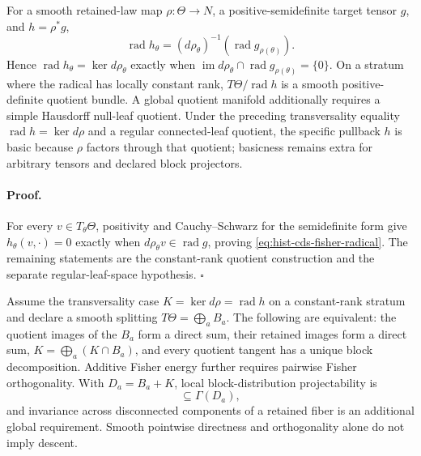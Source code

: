 For a smooth retained-law map \(\rho:\Theta\to N\), a positive-semidefinite
target tensor \(g\), and \(h=\rho^*g\),
\begin{equation}
\operatorname{rad}h_\theta
=(d\rho_\theta)^{-1}(\operatorname{rad}g_{\rho(\theta)}).
\label{eq:hist-cds-fisher-radical}
\end{equation}
Hence \(\operatorname{rad}h_\theta=\ker d\rho_\theta\) exactly when
\(\operatorname{im}d\rho_\theta\cap\operatorname{rad}g_{\rho(\theta)}
=\{0\}\).  On a stratum where the radical has locally constant rank,
\(T\Theta/\operatorname{rad}h\) is a smooth positive-definite quotient
bundle.  A global quotient manifold additionally requires a simple Hausdorff
null-leaf quotient.  Under the preceding transversality equality
\(\operatorname{rad}h=\ker d\rho\) and a regular connected-leaf quotient, the
specific pullback \(h\) is basic because \(\rho\) factors through that
quotient; basicness remains extra for arbitrary tensors and declared block
projectors.

\paragraph{Proof.}
For every \(v\in T_\theta\Theta\), positivity and Cauchy--Schwarz for the
semidefinite form give
\(h_\theta(v,\cdot)=0\) exactly when
\(d\rho_\theta v\in\operatorname{rad}g\), proving
\eqref{eq:hist-cds-fisher-radical}.  The remaining statements are the
constant-rank quotient construction and the separate regular-leaf-space
hypothesis.  \(\square\)

Assume the transversality case
\(K=\ker d\rho=\operatorname{rad}h\) on a constant-rank stratum and declare
a smooth splitting \(T\Theta=\bigoplus_aB_a\).  The following are equivalent:
the quotient images of the \(B_a\) form a direct sum, their retained images
form a direct sum, \(K=\bigoplus_a(K\cap B_a)\), and every quotient tangent
has a unique block decomposition.  Additive Fisher energy further requires
pairwise Fisher orthogonality.  With \(D_a=B_a+K\), local block-distribution
projectability is
\begin{equation}
[\Gamma(K),\Gamma(D_a)]\subseteq\Gamma(D_a),
\label{eq:hist-cds-block-projectability}
\end{equation}
and invariance across disconnected components of a retained fiber is an
additional global requirement.  Smooth pointwise directness and
orthogonality alone do not imply descent.  

